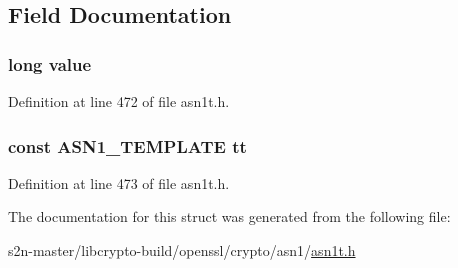 \subsection{Field Documentation}
\subsubsection[{\texorpdfstring{value}{value}}]{\setlength{\rightskip}{0pt plus 5cm}long value}\hypertarget{struct_a_s_n1___a_d_b___t_a_b_l_e__st_a6ccc3a2456c4631091ce42a637053789}{}\label{struct_a_s_n1___a_d_b___t_a_b_l_e__st_a6ccc3a2456c4631091ce42a637053789}


Definition at line 472 of file asn1t.\+h.

\subsubsection[{\texorpdfstring{tt}{tt}}]{\setlength{\rightskip}{0pt plus 5cm}const {\bf A\+S\+N1\+\_\+\+T\+E\+M\+P\+L\+A\+TE} tt}\hypertarget{struct_a_s_n1___a_d_b___t_a_b_l_e__st_ad89b57c7714b2c401003be33090f8c40}{}\label{struct_a_s_n1___a_d_b___t_a_b_l_e__st_ad89b57c7714b2c401003be33090f8c40}


Definition at line 473 of file asn1t.\+h.



The documentation for this struct was generated from the following file\+:\begin{DoxyCompactItemize}
\item 
s2n-\/master/libcrypto-\/build/openssl/crypto/asn1/\hyperlink{crypto_2asn1_2asn1t_8h}{asn1t.\+h}\end{DoxyCompactItemize}
